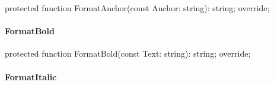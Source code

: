 \documentclass{report}
\newif\ifpdf
\begin{document}
\label{PasDoc_GenHtml.TGenericHTMLDocGenerator-FormatAnchor}
\begin{list}{}{
\setlength{\itemindent}{0cm}
\setlength{\listparindent}{0cm}
\setlength{\leftmargin}{\evensidemargin}
\addtolength{\leftmargin}{\tmplength}
\settowidth{\labelsep}{X}
\addtolength{\leftmargin}{\labelsep}
\setlength{\labelwidth}{\tmplength}
}
\item[\textbf{Declaration}\hfill]
\ifpdf
\begin{flushleft}
\fi
\begin{ttfamily}
protected function FormatAnchor(const Anchor: string): string; override;\end{ttfamily}

\ifpdf
\end{flushleft}
\fi

\end{list}
\paragraph*{FormatBold}\hspace*{\fill}

\label{PasDoc_GenHtml.TGenericHTMLDocGenerator-FormatBold}
\begin{list}{}{
\setlength{\itemindent}{0cm}
\setlength{\listparindent}{0cm}
\setlength{\leftmargin}{\evensidemargin}
\addtolength{\leftmargin}{\tmplength}
\settowidth{\labelsep}{X}
\addtolength{\leftmargin}{\labelsep}
\setlength{\labelwidth}{\tmplength}
}
\item[\textbf{Declaration}\hfill]
\ifpdf
\begin{flushleft}
\fi
\begin{ttfamily}
protected function FormatBold(const Text: string): string; override;\end{ttfamily}

\ifpdf
\end{flushleft}
\fi

\end{list}
\paragraph*{FormatItalic}\hspace*{\fill}
\end{document}
